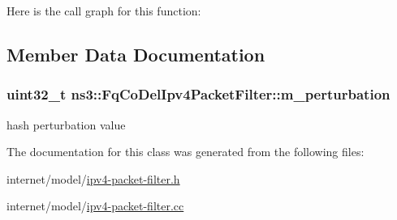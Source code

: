 Here is the call graph for this function\+:




\subsection{Member Data Documentation}
\subsubsection[{\texorpdfstring{m\+\_\+perturbation}{m_perturbation}}]{\setlength{\rightskip}{0pt plus 5cm}uint32\+\_\+t ns3\+::\+Fq\+Co\+Del\+Ipv4\+Packet\+Filter\+::m\+\_\+perturbation\hspace{0.3cm}{\ttfamily [private]}}\hypertarget{classns3_1_1FqCoDelIpv4PacketFilter_ad0cee61da1eb090b0a66c1a7722e991c}{}\label{classns3_1_1FqCoDelIpv4PacketFilter_ad0cee61da1eb090b0a66c1a7722e991c}


hash perturbation value 



The documentation for this class was generated from the following files\+:\begin{DoxyCompactItemize}
\item 
internet/model/\hyperlink{ipv4-packet-filter_8h}{ipv4-\/packet-\/filter.\+h}\item 
internet/model/\hyperlink{ipv4-packet-filter_8cc}{ipv4-\/packet-\/filter.\+cc}\end{DoxyCompactItemize}
